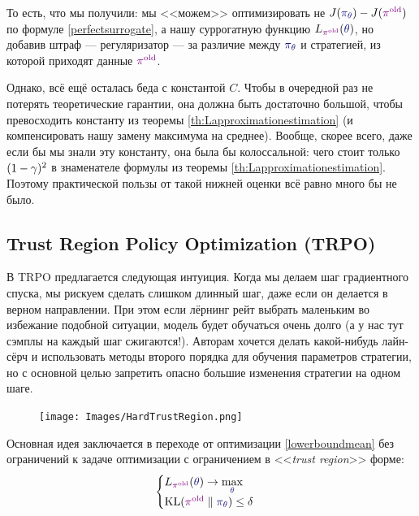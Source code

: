 То есть, что мы получили: мы <<можем>> оптимизировать не $J(\textcolor{ChadBlue}{\pi_\theta}) - J(\textcolor{ChadPurple}{\pi^{\old}})$ по формуле \eqref{perfectsurrogate}, а нашу суррогатную функцию $L_{\textcolor{ChadPurple}{\pi^{\old}}}(\textcolor{ChadBlue}{\theta})$, но добавив штраф --- регуляризатор --- за различие между $\textcolor{ChadBlue}{\pi_\theta}$ и стратегией, из которой приходят данные $\textcolor{ChadPurple}{\pi^{\old}}$.

Однако, всё ещё осталась беда с константой $C$. Чтобы в очередной раз не потерять теоретические гарантии, она должна быть достаточно большой, чтобы превосходить константу из теоремы \ref{th:Lapproximationestimation} (и компенсировать нашу замену максимума на среднее). Вообще, скорее всего, даже если бы мы знали эту константу, она была бы колоссальной: чего стоит только $(1 \HM- \gamma)^2$ в знаменателе формулы из теоремы \ref{th:Lapproximationestimation}. Поэтому практической пользы от такой нижней оценки всё равно много бы не было.

\subsection{Trust Region Policy Optimization (TRPO)}

В TRPO предлагается следующая интуиция. Когда мы делаем шаг градиентного спуска, мы рискуем сделать слишком длинный шаг, даже если он делается в верном направлении. При этом если лёрнинг рейт выбрать маленьким во избежание подобной ситуации, модель будет обучаться очень долго (а у нас тут сэмплы на каждый шаг сжигаются!). Авторам хочется делать какой-нибудь лайн-сёрч и использовать методы второго порядка для обучения параметров стратегии, но с основной целью запретить опасно большие изменения стратегии на одном шаге.

\begin{figure}
\vspace{-0.5cm}
\centering
\texttt{[image: Images/HardTrustRegion.png]}
\vspace{-0.9cm}
\end{figure}

Основная идея заключается в переходе от оптимизации \eqref{lowerboundmean} без ограничений к задаче оптимизации с ограничением в <<\emph{trust region}>> форме:
\begin{equation}\label{trustregion}
\begin{cases}
L_{\textcolor{ChadPurple}{\pi^{\old}}}(\textcolor{ChadBlue}{\theta}) \to \max\limits_{\textcolor{ChadBlue}{\theta}} \\
\KL(\textcolor{ChadPurple}{\pi^{\old}} \parallel \textcolor{ChadBlue}{\pi_\theta}) \le \delta
\end{cases}
\end{equation}


